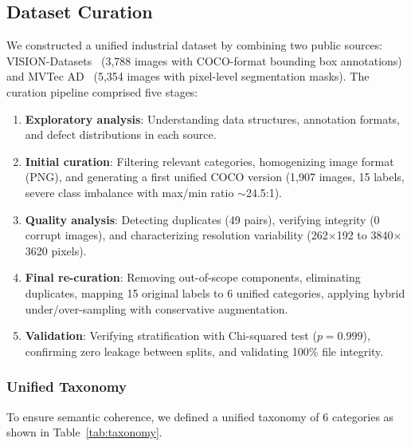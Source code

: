 \documentclass[journal,twoside,web]{ieeecolor}
\begin{document}
\subsection{Dataset Curation}

We constructed a unified industrial dataset by combining two public sources: VISION-Datasets~\cite{bai2023visiondatasets} (3,788 images with COCO-format bounding box annotations) and MVTec AD~\cite{bergmann2019mvtec} (5,354 images with pixel-level segmentation masks). The curation pipeline comprised five stages:

\begin{enumerate}
    \item \textbf{Exploratory analysis}: Understanding data structures, annotation formats, and defect distributions in each source.
    
    \item \textbf{Initial curation}: Filtering relevant categories, homogenizing image format (PNG), and generating a first unified COCO version (1,907 images, 15 labels, severe class imbalance with max/min ratio $\sim$24.5:1).
    
    \item \textbf{Quality analysis}: Detecting duplicates (49 pairs), verifying integrity (0 corrupt images), and characterizing resolution variability (262$\times$192 to 3840$\times$3620 pixels).
    
    \item \textbf{Final re-curation}: Removing out-of-scope components, eliminating duplicates, mapping 15 original labels to 6 unified categories, applying hybrid under/over-sampling with conservative augmentation.
    
    \item \textbf{Validation}: Verifying stratification with Chi-squared test ($p=0.999$), confirming zero leakage between splits, and validating 100\% file integrity.
\end{enumerate}

\subsubsection{Unified Taxonomy}

To ensure semantic coherence, we defined a unified taxonomy of 6 categories as shown in Table~\ref{tab:taxonomy}.
\end{document}
